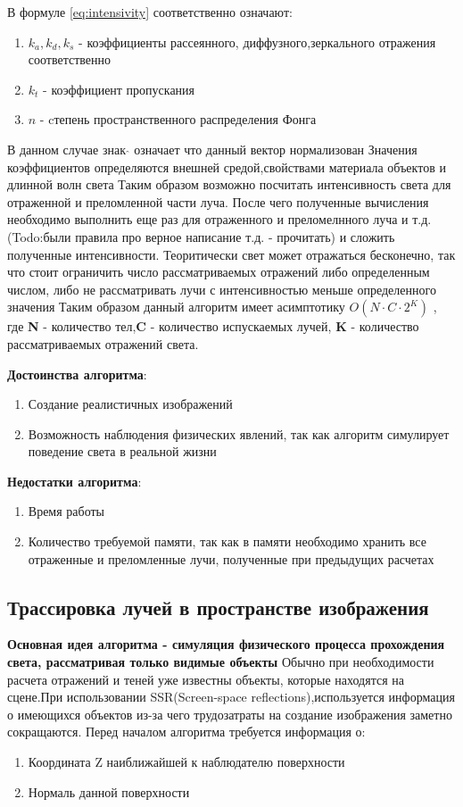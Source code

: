 \documentclass[a4paper,14pt, unknownkeysallowed]{extreport}
\begin{document}
В формуле \ref{eq:intensivity} соответственно означают:
\begin{enumerate}
	\item $k_a,k_d,k_s$ - коэффициенты рассеянного, диффузного,зеркального отражения соответственно
	\item $k_t$ - коэффициент пропускания
	\item $n$ - cтепень пространственного распределения Фонга
\end{enumerate}
В данном случае знак $ \hat{} $  означает что данный вектор нормализован
Значения коэффициентов определяются внешней средой,свойствами материала объектов и длинной волн света
Таким образом возможно посчитать интенсивность света для отраженной и преломленной части луча.
После чего полученные вычисления необходимо выполнить еще раз для отраженного и преломелнного луча и т.д.(Todo:были правила про верное написание т.д. - прочитать)
и сложить полученные интенсивности.
Теоритически свет может отражаться бесконечно, так что стоит ограничить число рассматриваемых отражений либо определенным числом,
либо не рассматривать лучи с интенсивностью меньше определенного значения
Таким образом данный алгоритм имеет асимптотику $O(N \cdot C \cdot 2^{K})$ , где \textbf{N} - количество тел,\textbf{C} - количество испускаемых лучей,
\textbf{K} - количество рассматриваемых отражений света. \cite{Rodgers}


\textbf{Достоинства алгоритма}:
\begin{enumerate}
	\item Создание реалистичных изображений
	\item Возможность наблюдения физических явлений, так как алгоритм симулирует поведение света в реальной жизни
\end{enumerate}


\textbf{Недостатки алгоритма}:
\begin{enumerate}
	\item Время работы
	\item Количество требуемой памяти, так как в памяти необходимо хранить все отраженные и преломленные лучи, полученные при предыдущих расчетах
\end{enumerate}


\subsection{Трассировка лучей в пространстве изображения}
\textbf{Основная идея алгоритма - симуляция физического процесса прохождения света, рассматривая только видимые объекты} \newline
Обычно при необходимости расчета отражений и теней уже известны объекты, которые находятся на сцене.При использовании SSR(Screen-space reflections),используется информация о имеющихся
объектов из-за чего трудозатраты на создание изображения заметно сокращаются.\cite{SSR}
Перед началом алгоритма требуется информация о:
\begin{enumerate}
	\item Координата Z наиближайшей к наблюдателю поверхности
	\item Нормаль данной поверхности
\end{enumerate}
\end{document}
